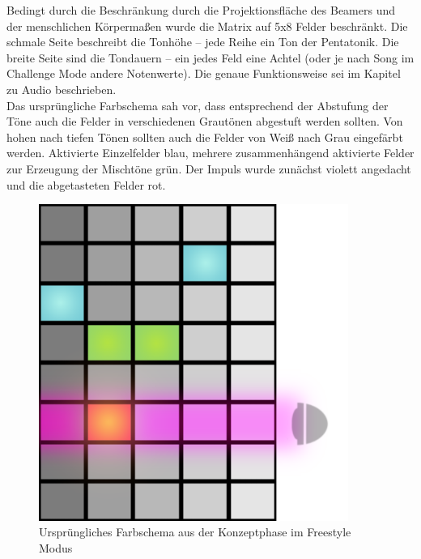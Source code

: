 
Bedingt durch die Beschränkung durch die Projektionsfläche des Beamers und der menschlichen Körpermaßen wurde die Matrix auf 5x8 Felder beschränkt. Die schmale Seite beschreibt die Tonhöhe – jede Reihe ein Ton der Pentatonik. Die breite Seite sind die Tondauern – ein jedes Feld eine Achtel (oder je nach Song im Challenge Mode andere Notenwerte). Die genaue Funktionsweise sei im Kapitel zu Audio beschrieben.\\

Das ursprüngliche Farbschema sah vor, dass entsprechend der Abstufung der Töne auch die Felder in verschiedenen Grautönen abgestuft werden sollten. Von hohen nach tiefen Tönen sollten auch die Felder von Weiß nach Grau eingefärbt werden. Aktivierte Einzelfelder blau, mehrere zusammenhängend aktivierte Felder zur Erzeugung der Mischtöne grün. Der Impuls wurde zunächst violett angedacht und die abgetasteten Felder rot.

\begin{figure}[htbp]
	\centering
		\includegraphics[width=0.9\textwidth]{images/designfelder.png}
	\caption{Ursprüngliches Farbschema aus der Konzeptphase im Freestyle Modus}
	\label{fig:Design}
\end{figure}

